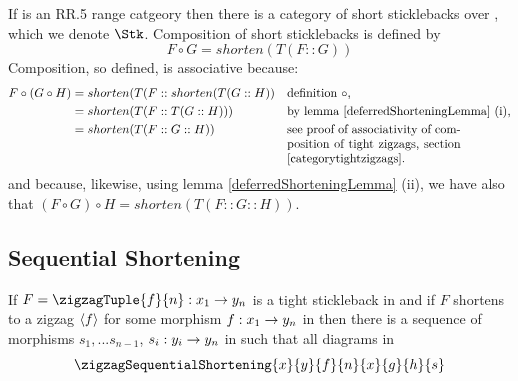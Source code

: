 {If \catcw is an RR.5 range catgeory then
 there is a category of short sticklebacks over \catc, which we denote
 $\Stk$.
Composition of short sticklebacks is defined by
\[
F \circ G = shorten(T(F::G)) 
\]
Composition, so defined, is associative because:
\begin{align*}
F \circ (G \circ H)
  &= shorten(T(F :: shorten(T(G ::H)) && \mbox{definition $\circ$,} \\
  &= shorten (T(F::T(G::H))) && \mbox{by lemma \ref{deferredShorteningLemma} (i),} \\
  &= shorten (T(F::G::H))    && \mbox{\parbox[t]{5cm}{see proof of associativity of composition of tight zigzags, section \ref{categorytightzigzags}.}}
\end{align*}  
and because, likewise, 
using lemma \ref{deferredShorteningLemma} (ii),
we have also that $(F \circ G) \circ H=shorten (T(F::G::H))$.

\subsection{Sequential Shortening}
\begin{lemma}
If $F=\zigzagTuple{f}{n}:x_1 \morph y_n$ 
is a tight stickleback in  \catcw
and if $F$ shortens to a zigzag $\langle f\rangle$ for some
morphism $f:x_1 \rightarrow y_n$ in \catcw then  there
is a sequence of morphisms $s_1,...s_{n-1}$,
$s_i: y_i \rightarrow y_n$ in \catcw
such that all diagrams in 
\[
\zigzagSequentialShortening{x}{y}{f}{n}{x}{g}{h}{s}
\]


\end{lemma}}
